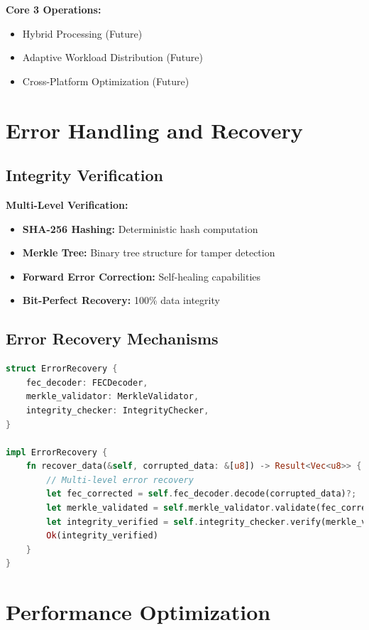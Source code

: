 \documentclass[12pt,a4paper]{article}
\begin{document}
\textbf{Core 3 Operations:}
\begin{itemize}
    \item Hybrid Processing (Future)
    \item Adaptive Workload Distribution (Future)
    \item Cross-Platform Optimization (Future)
\end{itemize}

\section{Error Handling and Recovery}

\subsection{Integrity Verification}

\textbf{Multi-Level Verification:}
\begin{itemize}
    \item \textbf{SHA-256 Hashing:} Deterministic hash computation
    \item \textbf{Merkle Tree:} Binary tree structure for tamper detection
    \item \textbf{Forward Error Correction:} Self-healing capabilities
    \item \textbf{Bit-Perfect Recovery:} 100\% data integrity
\end{itemize}

\subsection{Error Recovery Mechanisms}

\begin{lstlisting}[language=Rust, caption=Error Recovery System]
struct ErrorRecovery {
    fec_decoder: FECDecoder,
    merkle_validator: MerkleValidator,
    integrity_checker: IntegrityChecker,
}

impl ErrorRecovery {
    fn recover_data(&self, corrupted_data: &[u8]) -> Result<Vec<u8>> {
        // Multi-level error recovery
        let fec_corrected = self.fec_decoder.decode(corrupted_data)?;
        let merkle_validated = self.merkle_validator.validate(fec_corrected)?;
        let integrity_verified = self.integrity_checker.verify(merkle_validated)?;
        Ok(integrity_verified)
    }
}
\end{lstlisting}

\section{Performance Optimization}
\end{document}

